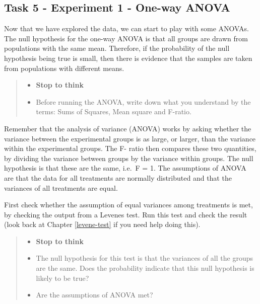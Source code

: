 \documentclass[
]{book}
\providecommand{\tightlist}{%
  \setlength{\itemsep}{0pt}\setlength{\parskip}{0pt}}
\begin{document}
\subsection{Task 5 - Experiment 1 - One-way ANOVA}\label{task-5---experiment-1---one-way-anova}

Now that we have explored the data, we can start to play with some ANOVAs. The null hypothesis for the one-way ANOVA is that all groups are drawn from populations with the same mean. Therefore, if the probability of the null hypothesis being true is small, then there is evidence that the samples are taken from populations with different means.

\begin{quote}
\begin{itemize}
\tightlist
\item
  \textbf{Stop to think}
\item
  Before running the ANOVA, write down what you understand by the terms: Sums of Squares, Mean square and F-ratio.
\end{itemize}
\end{quote}

Remember that the analysis of variance (ANOVA) works by asking whether the variance between the experimental groups is as large, or larger, than the variance within the experimental groups. The F- ratio then compares these two quantities, by dividing the variance between groups by the variance within groups. The null hypothesis is that these are the same, i.e.~F = 1. The assumptions of ANOVA are that the data for all treatments are normally distributed and that the variances of all treatments are equal.

First check whether the assumption of equal variances among treatments is met, by checking the output from a Levenes test. Run this test and check the result (look back at Chapter \ref{levene-test} if you need help doing this).

\begin{quote}
\begin{itemize}
\tightlist
\item
  \textbf{Stop to think}
\item
  The null hypothesis for this test is that the variances of all the groups are the same. Does the probability indicate that this null hypothesis is likely to be true?
\item
  Are the assumptions of ANOVA met?
\end{itemize}
\end{quote}
\end{document}
